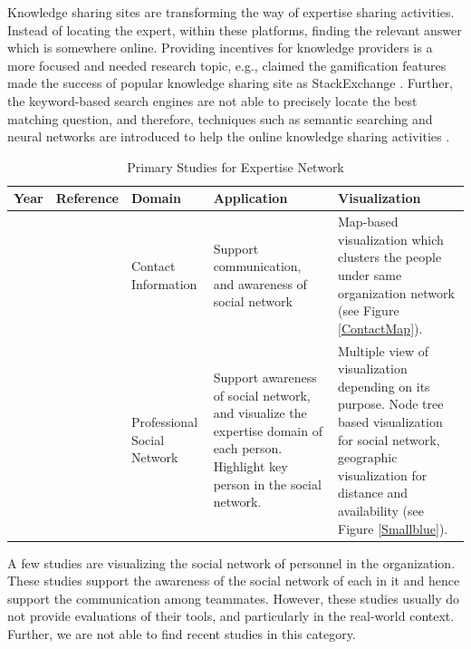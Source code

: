 Knowledge sharing sites are transforming the way of expertise sharing activities. Instead of locating the expert, within these platforms, finding the relevant answer which is somewhere online. Providing incentives for knowledge providers is a more focused and needed research topic, e.g., \citeauthor{vasilescu2014social} claimed the gamification features made the success of popular knowledge sharing site as StackExchange \cite{vasilescu2014social}. Further, the keyword-based search engines are not able to precisely locate the best matching question, and therefore, techniques such as semantic searching and neural networks are introduced to help the online knowledge sharing activities \cite{gottipati2011finding, xu2016predicting}.

\begin{table}[htbp]
\centering
\footnotesize
\settowidth{}
\begin{tabulary}{\textwidth}{LLLLL}
\hline
\textbf{Year}           & \textbf{Reference}          & \textbf{Domain}  &\textbf{Application}  & \textbf{Visualization} \\ \hline
\citeyear{nardi2002integrating} & \citeauthor{nardi2002integrating}\cite{nardi2002integrating} & Contact Information & Support communication, and awareness of social network & Map-based visualization which clusters the people under same organization network (see Figure \ref{ContactMap}). \\\hline
\citeyear{lin2009smallblue} & \citeauthor{lin2009smallblue}\cite{lin2009smallblue} & Professional Social Network & Support awareness of social network, and visualize the expertise domain of each person. Highlight key person in the social network. & Multiple view of visualization depending on its purpose. Node tree based visualization for social network, geographic visualization for distance and availability (see Figure \ref{Smallblue}).\\
\hline
\end{tabulary}
\caption{Primary Studies for Expertise Network}
\label{tab:network}
\end{table}

A few studies are visualizing the social network of personnel in the organization. These studies support the awareness of the social network of each in it and hence support the communication among teammates. However, these studies usually do not provide evaluations of their tools, and particularly in the real-world context. Further, we are not able to find recent studies in this category.

